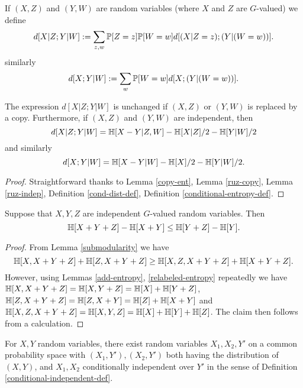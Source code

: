 \begin{definition}\label{cond-dist-def}
If $(X, Z)$ and $(Y, W)$ are random variables (where $X$ and $Z$ are $G$-valued) we define
$$ d[X  | Z; Y | W] := \sum_{z,w}  \mathbb{P}[Z=z]  \mathbb{P}[W=w] d[(X|Z=z); (Y|(W=w))].$$
similarly
$$ d[X; Y | W] := \sum_{w}  \mathbb{P}[W=w] d[X; (Y|(W=w))].$$
\end{definition}

\begin{lemma}\label{cond-dist-alt}
\leanok
  The expression $d[X  | Z;Y | W]$ is unchanged if $(X,Z)$ or $(Y,W)$ is replaced by a copy.  Furthermore, if $(X,Z)$ and $(Y,W)$ are independent, then
$$  d[X  | Z;Y | W] = \mathbb{H}[X-Y|Z,W] - \mathbb{H}[X|Z]/2 - \mathbb{H}[Y|W]/2$$
and similarly
$$  d[X;Y | W] = \mathbb{H}[X-Y|W] - \mathbb{H}[X]/2 - \mathbb{H}[Y|W]/2.$$
\end{lemma}

\begin{proof} Straightforward thanks to Lemma \ref{copy-ent}, Lemma \ref{ruz-copy}, Lemma \ref{ruz-indep}, Definition \ref{cond-dist-def}, Definition \ref{conditional-entropy-def}.
\end{proof}

\begin{lemma}\label{kv}
  \leanok
Suppose that $X, Y, Z$ are independent $G$-valued random variables. Then
\[
  \mathbb{H}[X + Y + Z] - \mathbb{H}[X + Y] \leq \mathbb{H}[Y+Z] - \mathbb{H}[Y].
\]
\end{lemma}

\begin{proof}\leanok
From Lemma \ref{submodularity} we have
$$ \mathbb{H}[X, X+Y+Z] + \mathbb{H}[Z, X+Y+Z] \geq \mathbb{H}[X, Z, X+Y+Z] + \mathbb{H}[X+Y+Z].$$
However, using Lemmas \ref{add-entropy}, \ref{relabeled-entropy} repeatedly we have $\mathbb{H}[X, X+Y+Z] = \mathbb{H}[X, Y+Z] = \mathbb{H}[X] + \mathbb{H}[Y+Z]$, $\mathbb{H}[Z, X+Y + Z] = \mathbb{H}[Z, X+Y] = \mathbb{H}[Z] + \mathbb{H}[X+Y]$ and $\mathbb{H}[X, Z, X+Y+Z] = \mathbb{H}[X, Y, Z] = \mathbb{H}[X] + \mathbb{H}[Y] + \mathbb{H}[Z]$.  The claim then follows from a calculation.
\end{proof}

\begin{lemma}\label{cond-indep-exist}
  \leanok
  For $X,Y$ random variables, there exist random variables $X_1,X_2,Y'$ on a common probability space with $(X_1, Y'), (X_2, Y')$ both having the distribution of $(X,Y)$, and $X_1, X_2$ conditionally independent over $Y'$ in the sense of Definition \ref{conditional-independent-def}.
\end{lemma}

